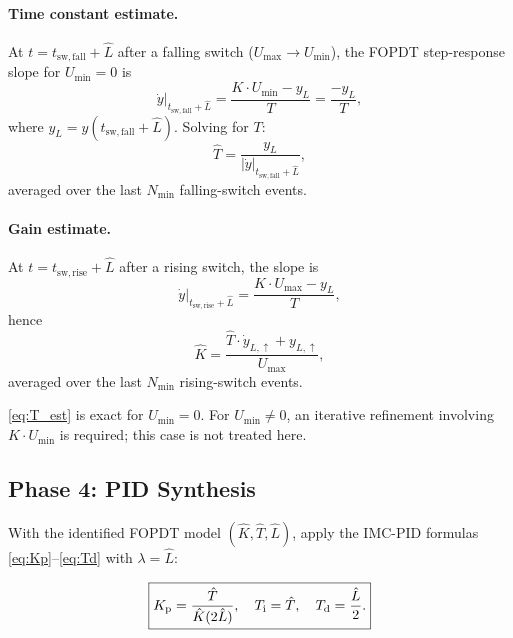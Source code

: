 \paragraph{Time constant estimate.}
At $t = t_{\mathrm{sw,fall}} + \hat{L}$ after a falling switch ($U_{\max} \to U_{\min}$),
the FOPDT step-response slope for $U_{\min} = 0$ is
\begin{equation}
    \dot{y}\big|_{t_{\mathrm{sw,fall}} + \hat{L}}
    = \frac{K \cdot U_{\min} - y_L}{T}
    = \frac{-y_L}{T},
    \label{eq:slope_fall}
\end{equation}
where $y_L = y(t_{\mathrm{sw,fall}} + \hat{L})$.
Solving for $T$:
\begin{equation}
    \hat{T} = \frac{y_L}{|\dot{y}|_{t_{\mathrm{sw,fall}} + \hat{L}}},
    \label{eq:T_est}
\end{equation}
averaged over the last $N_{\min}$ falling-switch events.

\paragraph{Gain estimate.}
At $t = t_{\mathrm{sw,rise}} + \hat{L}$ after a rising switch, the slope is
\begin{equation}
    \dot{y}\big|_{t_{\mathrm{sw,rise}} + \hat{L}}
    = \frac{K \cdot U_{\max} - y_L}{T},
    \label{eq:slope_rise}
\end{equation}
hence
\begin{equation}
    \hat{K} = \frac{\hat{T} \cdot \dot{y}_{L,\uparrow} + y_{L,\uparrow}}{U_{\max}},
    \label{eq:K_est}
\end{equation}
averaged over the last $N_{\min}$ rising-switch events.

\begin{remark}
    \eqref{eq:T_est} is exact for $U_{\min} = 0$.
    For $U_{\min} \neq 0$, an iterative refinement involving
    $K \cdot U_{\min}$ is required; this case is not treated here.
\end{remark}

\subsection{Phase 4: PID Synthesis}
\label{sec:method:phase4}

With the identified FOPDT model $(\hat{K}, \hat{T}, \hat{L})$, apply the
IMC-PID formulas \eqref{eq:Kp}--\eqref{eq:Td} with $\lambda = \hat{L}$:

\begin{equation}
    \boxed{
    K_{\mathrm{p}} = \frac{\hat{T}}{\hat{K}(2\hat{L})},
    \quad
    T_{\mathrm{i}} = \hat{T},
    \quad
    T_{\mathrm{d}} = \frac{\hat{L}}{2}.
    }
    \label{eq:pid_final}
\end{equation}

